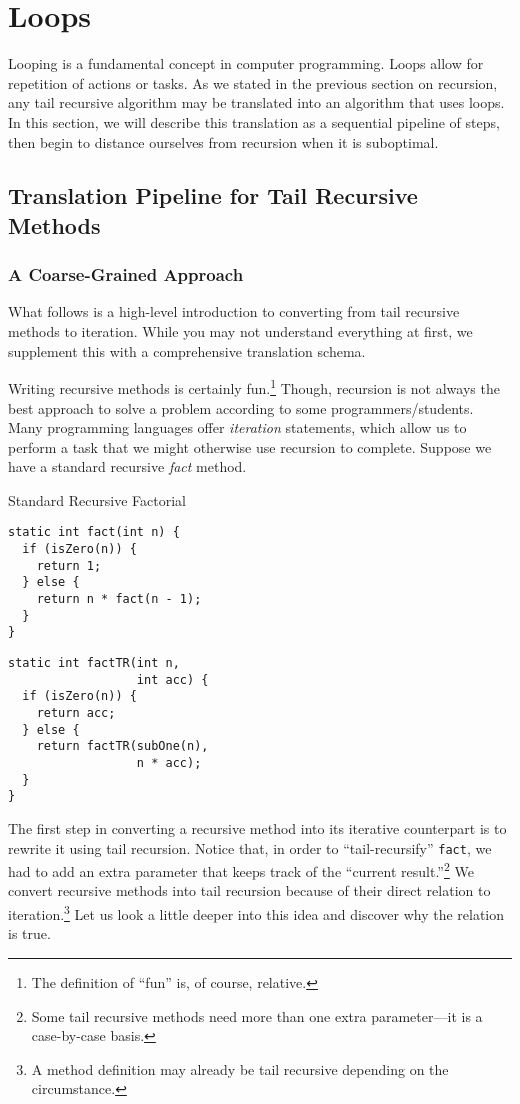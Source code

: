 \section{Loops}

Looping is a fundamental concept in computer programming. 
Loops allow for repetition of actions or tasks. 
As we stated in the previous section on recursion, any tail recursive algorithm may be translated into an algorithm that uses loops. 
In this section, we will describe this translation as a sequential pipeline of steps, then begin to distance ourselves from recursion when it is suboptimal.

\subsection{Translation Pipeline for Tail Recursive Methods}
\subsubsection*{A Coarse-Grained Approach}
What follows is a high-level introduction to converting from tail recursive methods to iteration. 
While you may not understand everything at first, we supplement this with a comprehensive translation schema.

Writing recursive methods is certainly fun.\footnote{The definition of ``fun'' is, of course, relative.} 
Though, recursion is not always the best approach to solve a problem according to some programmers/students. 
Many programming languages offer \emph{iteration} statements, which allow us to perform a task that we might otherwise use recursion to complete. 
Suppose we have a standard recursive \emph{fact} method. 

\begin{clrr}[]{Standard Recursive Factorial}
\begin{lstlisting}[language=MyJavaNF]
static int fact(int n) {
  if (isZero(n)) { 
    return 1; 
  } else {
    return n * fact(n - 1);
  }
}
\end{lstlisting}
\tcblower
\begin{lstlisting}[language=MyJavaNF]
static int factTR(int n, 
                  int acc) {
  if (isZero(n)) { 
    return acc; 
  } else {
    return factTR(subOne(n), 
                  n * acc);
  }
}
\end{lstlisting}
\end{clrr}

The first step in converting a recursive method into its iterative counterpart is to rewrite it using tail recursion. 
Notice that, in order to ``tail-recursify'' \texttt{fact}, we had to add an extra parameter that keeps track of the ``current result.''\footnote{Some tail recursive methods need more than one extra parameter---it is a case-by-case basis.} 
We convert recursive methods into tail recursion because of their direct relation to iteration.\footnote{A method definition may already be tail recursive depending on the circumstance.} 
Let us look a little deeper into this idea and discover why the relation is true.

